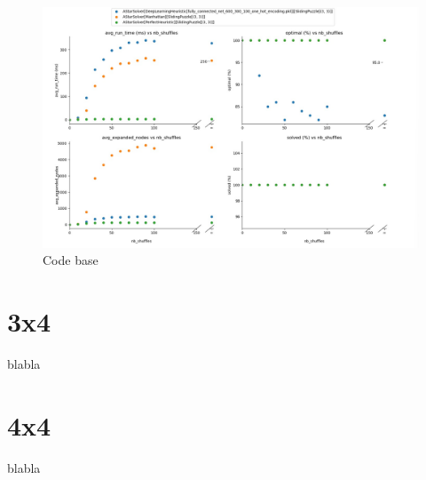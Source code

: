 \begin{landscape}
\begin{figure}[H]
\centering
\includegraphics[scale=0.5]{./Figures/33SPPerformance.jpeg}
\caption[Codebase]{Code base}
\label{fig:Codebase}
\end{figure}
\end{landscape}


\section{3x4}

blabla


\section{4x4}

blabla
